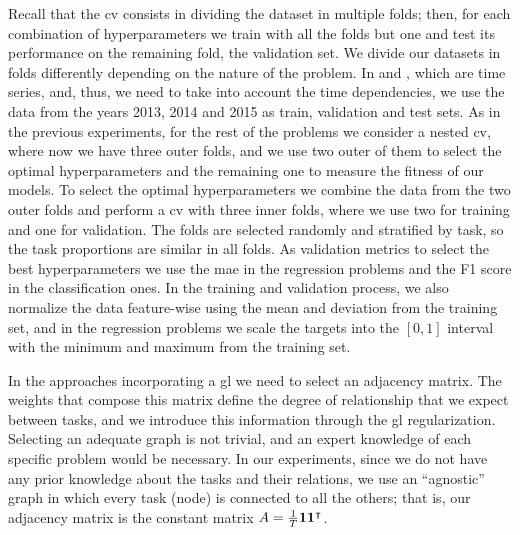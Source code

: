 Recall that the \acrshort{cv} consists in dividing the dataset in multiple folds; then, for each combination of hyperparameters we train with all the folds but one and test its performance on the remaining fold, the validation set. We divide our datasets in folds differently depending on the nature of the problem.
In  and , which are time series, and, thus, we need to take into account the time dependencies, we use the data from the years 2013, 2014 and 2015 as train, validation and test sets.
%
As in the previous experiments, for the rest of the problems we consider a nested \acrshort{cv}, where now we have three outer folds, and we use two outer of them to select the optimal hyperparameters and the remaining one to measure the fitness of our models. To select the optimal hyperparameters we combine the data from the two outer folds and perform a \acrshort{cv} with three inner folds, where we use two for training and one for validation.
The folds are selected randomly and stratified by task, so the task proportions are similar in all folds.
As validation metrics to select the best hyperparameters we use the \acrshort{mae} in the regression problems and the F1 score in the classification ones.
In the training and validation process, we also normalize the data feature-wise using the mean and deviation from the training set, and in the regression problems we scale the targets into the $[0, 1]$ interval with the minimum and maximum from the training set.

In the approaches incorporating a \acrshort{gl} we need to select an adjacency matrix. The weights that compose this matrix define the degree of relationship that we expect between tasks, and we introduce this information through the \acrshort{gl} regularization.
%
Selecting an adequate graph is not trivial, and an expert knowledge of each specific problem would be necessary. In our experiments, since we do not have any prior knowledge about the tasks and their relations, we use an ``agnostic'' graph in which every task (node) is connected to all the others; that is, our adjacency matrix is the constant matrix $A = \frac{1}{T} \bm{1} \bm{1}^\intercal$.


